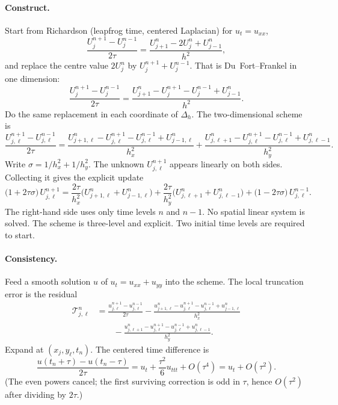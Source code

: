 \paragraph{Construct.}

Start from Richardson (leapfrog time, centered Laplacian) for \(u_t=u_{xx}\),
\[
\frac{U_j^{n+1}-U_j^{n-1}}{2\tau}
=
\frac{U_{j+1}^n-2U_j^n+U_{j-1}^n}{h^2},
\]
and replace the centre value \(2U_j^n\) by \(U_j^{n+1}+U_j^{n-1}\). That is Du~Fort--Frankel in one dimension:
\[
\frac{U_j^{n+1}-U_j^{n-1}}{2\tau}
=
\frac{U_{j+1}^n-U_j^{n+1}-U_j^{n-1}+U_{j-1}^n}{h^2}.
\]
Do the same replacement in each coordinate of \(\Delta_h\). The two-dimensional scheme is
\[
\frac{U_{j,\ell}^{n+1}-U_{j,\ell}^{n-1}}{2\tau}
=
\frac{U_{j+1,\ell}^n-U_{j,\ell}^{n+1}-U_{j,\ell}^{n-1}+U_{j-1,\ell}^n}{h_x^2}
+
\frac{U_{j,\ell+1}^n-U_{j,\ell}^{n+1}-U_{j,\ell}^{n-1}+U_{j,\ell-1}^n}{h_y^2}.
\]
Write \(\sigma=1/h_x^2+1/h_y^2\). The unknown \(U_{j,\ell}^{n+1}\) appears linearly on both sides. Collecting it gives the explicit update
\[
\bigl(1+2\tau\sigma\bigr)\,U_{j,\ell}^{n+1}
=
\frac{2\tau}{h_x^2}\bigl(U_{j+1,\ell}^n+U_{j-1,\ell}^n\bigr)
+
\frac{2\tau}{h_y^2}\bigl(U_{j,\ell+1}^n+U_{j,\ell-1}^n\bigr)
+
\bigl(1-2\tau\sigma\bigr)\,U_{j,\ell}^{n-1}.
\]
The right-hand side uses only time levels \(n\) and \(n-1\). No spatial linear system is solved. The scheme is three-level and explicit. Two initial time levels are required to start.

\paragraph{Consistency.}

Feed a smooth solution \(u\) of \(u_t=u_{xx}+u_{yy}\) into the scheme. The local truncation error is the residual
\begin{align*}
\mathcal T_{j,\ell}^n
&=
\frac{u_{j,\ell}^{n+1}-u_{j,\ell}^{n-1}}{2\tau}
-
\frac{u_{j+1,\ell}^n-u_{j,\ell}^{n+1}-u_{j,\ell}^{n-1}+u_{j-1,\ell}^n}{h_x^2}
\\
&\qquad
-
\frac{u_{j,\ell+1}^n-u_{j,\ell}^{n+1}-u_{j,\ell}^{n-1}+u_{j,\ell-1}^n}{h_y^2}.
\end{align*}
Expand at \((x_j,y_\ell,t_n)\). The centered time difference is
\[
\frac{u(t_n+\tau)-u(t_n-\tau)}{2\tau}
=
u_t+\frac{\tau^2}{6}u_{ttt}+O(\tau^4)
=
u_t+O(\tau^2).
\]
(The even powers cancel; the first surviving correction is odd in \(\tau\), hence \(O(\tau^2)\) after dividing by \(2\tau\).)

